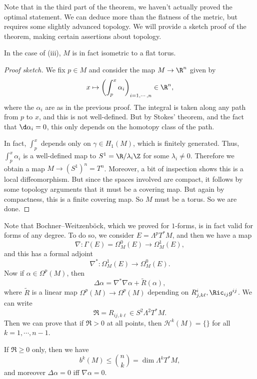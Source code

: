 \documentclass[a4paper]{article}
\begin{document}
Note that in the third part of the theorem, we haven't actually proved the optimal statement. We can deduce more than the flatness of the metric, but requires some slightly advanced topology. We will provide a sketch proof of the theorem, making certain assertions about topology.

\begin{prop}
  In the case of (iii), $M$ is in fact isometric to a flat torus.
\end{prop}

\begin{proof}[Proof sketch]
  We fix $p \in M$ and consider the map $M \to \R^n$ given by
  \[
    x \mapsto \left(\int_p^x \alpha_i\right)_{i = 1, \cdots, n} \in \R^n,
  \]
  where the $\alpha_i$ are as in the previous proof. The integral is taken along any path from $p$ to $x$, and this is not well-defined. But by Stokes' theorem, and the fact that $\d \alpha_i = 0$, this only depends on the homotopy class of the path.

  In fact, $\int_p^x$ depends only on $\gamma \in H_1(M)$, which is finitely generated. Thus, $\int_p^x \alpha_i$ is a well-defined map to $S^1 = \R/\lambda_i \Z$ for some $\lambda_i \not= 0$. Therefore we obtain a map $M \to (S^1)^n = T^n$. Moreover, a bit of inspection shows this is a local diffeomorphism. But since the spaces involved are compact, it follows by some topology arguments that it must be a covering map. But again by compactness, this is a finite covering map. So $M$ must be a torus. So we are done.
\end{proof}

Note that Bochner--Weitzenb\"ock, which we proved for $1$-forms, is in fact valid for forms of any degree. To do so, we consider $E = \Lambda^p T^* M$, and then we have a map
\[
  \nabla: \Gamma(E) = \Omega_M^0(E) \to \Omega_M^1(E),
\]
and this has a formal adjoint
\[
  \nabla^*: \Omega_M^1(E) \to \Omega_M^0(E).
\]
Now if $\alpha \in \Omega^p(M)$, then
\[
  \Delta \alpha = \nabla^* \nabla \alpha + \tilde{R}(\alpha),
\]
where $\tilde{R}$ is a linear map $\Omega^p(M) \to \Omega^p(M)$ depending on $R^i_{j, k\ell}, \Ric_{ij} g^{ij}$. We can write
\[
  \mathfrak{R} = R_{ij, k\ell} \in S^2 \Lambda^2 T^* M.
\]
Then we can prove that if $\mathfrak{R} > 0$ at all points, then $\mathcal{H}^k(M) = \{\}$ for all $k = 1, \cdots, n - 1$.

If $\mathfrak{R} \geq 0$ only, then we have
\[
  b^k(M) \leq \binom{n}{k} = \dim \Lambda^k T^* M,
\]
and moreover $\Delta \alpha = 0$ iff $\nabla \alpha = 0$.
\end{document}
